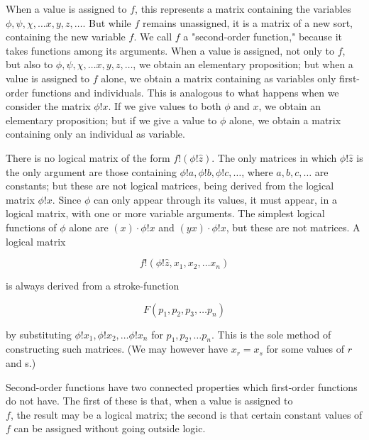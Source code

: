 \documentclass[10pt]{article}
\begin{document}
When a value is assigned to $f$, this represents a matrix containing the variables $\phi, \psi, \chi, \ldots x, y, z, \ldots$. But while $f$ remains unassigned, it is a matrix of a new sort, containing the new variable $f$. We call $f$ a "second-order function," because it takes functions among its arguments. When a value is assigned, not only to $f$, but also to $\phi, \psi, \chi, \ldots x, y, z, \ldots$, we obtain an elementary proposition; but when a value is assigned to $f$ alone, we obtain a matrix containing as variables only first-order functions and individuals. This is analogous to what happens when we consider the matrix $\phi!x$. If we give values to both $\phi$ and $x$, we obtain an elementary proposition; but if we give a value to $\phi$ alone, we obtain a matrix containing only an individual as variable.

There is no logical matrix of the form $f!(\phi!\hat{z})$. The only matrices in which $\phi!\hat{z}$ is the only argument are those containing $\phi!a, \phi!b, \phi!c, \ldots$, where $a, b, c, \ldots$ are constants; but these are not logical matrices, being derived from the logical matrix $\phi!x$. Since $\phi$ can only appear through its values, it must appear, in a logical matrix, with one or more variable arguments. The simplest logical functions of $\phi$ alone are $(x) \cdot \phi!x$ and $(y x) \cdot \phi!x$, but these are not matrices. A logical matrix

$$
f!\left(\phi!\hat{z}, x_{1}, x_{2}, \ldots x_{n}\right)
$$

is always derived from a stroke-function

$$
F\left(p_{1}, p_{2}, p_{3}, \ldots p_{n}\right)
$$

by substituting $\phi!x_{1}, \phi!x_{2}, \ldots \phi!x_{n}$ for $p_{1}, p_{2}, \ldots p_{n}$. This is the sole method of constructing such matrices. (We may however have $x_{r}=x_{s}$ for some values of $r$ and s.)

Second-order functions have two connected properties which first-order functions do not have. The first of these is that, when a value is assigned to\\
$f$, the result may be a logical matrix; the second is that certain constant values of $f$ can be assigned without going outside logic.
\end{document}
